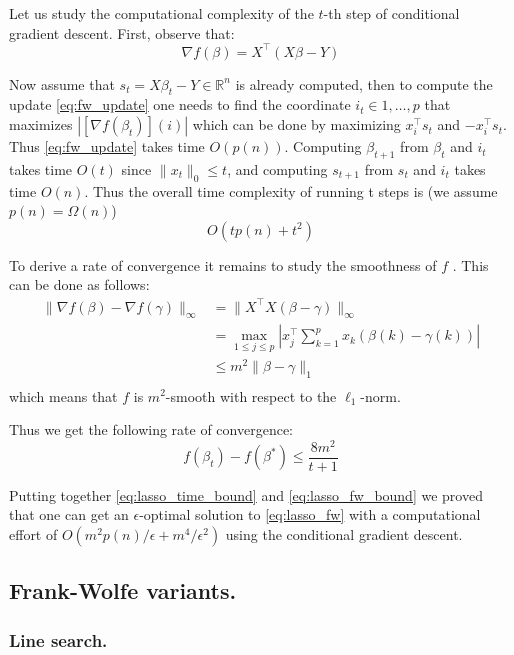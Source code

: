 Let us study the computational complexity of the $t$-th step of
conditional gradient descent. First, observe that:
\begin{equation}
\nabla f (\beta)=X^\top (X\beta-Y) \nonumber
\end{equation}

Now assume that $s_t=X \beta_t - Y \in \mathbb{R}^n$ is already computed, then to compute the update \ref{eq:fw_update} one needs to find  the coordinate $i_t \in 1,\ldots,p$ that maximizes $| [\nabla f(\beta_t)](i) |$ which can be done by maximizing $x_i^\top s_t$ and $-x_i^\top s_t$. Thus \ref{eq:fw_update} takes time $O(p(n))$. Computing $\beta_{t+1}$ from $\beta_t$ and $i_t$ takes time $O(t)$ since $\|x_t \|_0 \leq t$, and computing $s_{t+1}$ from $s_t$ and $i_t$ takes time $O(n)$. Thus the overall time complexity of running t steps is (we assume $p(n) =\Omega(n)$)
\begin{equation} \label{eq:lasso_time_bound}
O(tp(n) + t^2 )
\end{equation}

To derive a rate of convergence it remains to study the smoothness
of $f$ . This can be done as follows:
\begin{align}
\| \nabla f(\beta) - \nabla f(\gamma) \|_{\infty} & = \| X^\top X(\beta-\gamma) \|_{\infty} \nonumber \\
& = \max_{1 \leq j \leq p} | x_j^\top \sum_{k=1}^{p} x_k(\beta(k)-\gamma(k)) | \nonumber \\
& \leq m^2 \| \beta-\gamma \|_1 \nonumber \\
\end{align}
which means that $f$ is $m^2$-smooth with respect to the $\ell_1$-norm.

Thus we get the following rate of convergence:
\begin{equation} \label{eq:lasso_fw_bound}
f(\beta_t)-f(\beta^*) \leq \frac{8 m^2}{t+1}
\end{equation}

Putting together \ref{eq:lasso_time_bound} and \ref{eq:lasso_fw_bound} we proved that one can get an $\epsilon$-optimal solution to \ref{eq:lasso_fw} with a computational effort of $O(m^2 p(n)/\epsilon+m^4/\epsilon^2)$ using the conditional gradient descent.

\subsection{Frank-Wolfe variants.}

\subsubsection{Line search.}

